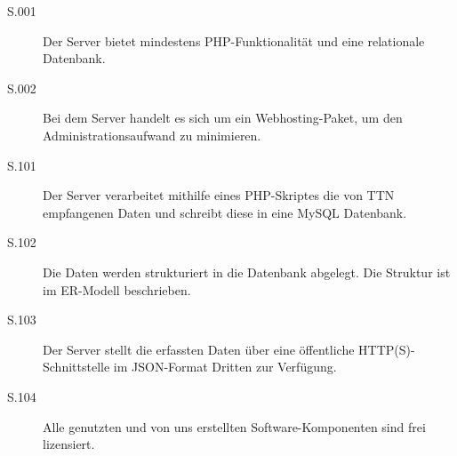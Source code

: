 \begin{description}
	\item[S.001]
		Der Server bietet mindestens PHP-Funktionalität und eine relationale Datenbank.

	\item[S.002]
		Bei dem Server handelt es sich um ein Webhosting-Paket, um den
		Administrationsaufwand zu minimieren.
\end{description}

\begin{description}
	\item[S.101]
		Der Server verarbeitet mithilfe eines PHP-Skriptes die von TTN empfangenen
		Daten und schreibt diese in eine MySQL Datenbank.

	\item[S.102]
		Die Daten werden strukturiert in die Datenbank abgelegt. Die Struktur ist im
		ER-Modell beschrieben.

	\item[S.103]
		Der Server stellt die erfassten Daten über eine öffentliche HTTP(S)-Schnittstelle
		im JSON-Format Dritten zur Verfügung.

	\item[S.104]
		Alle genutzten und von uns erstellten Software-Komponenten sind frei lizensiert.
\end{description}
